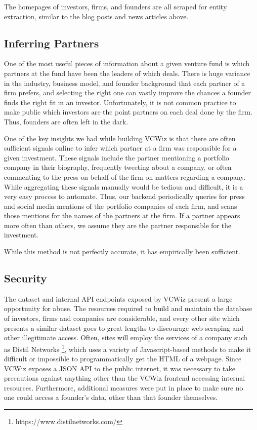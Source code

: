 The homepages of investors, firms, and founders are all scraped for entity extraction, similar to the blog posts and news articles above.

\subsection{Inferring Partners}
\label{ch4:partners}

One of the most useful pieces of information about a given venture fund is which partners at the fund have been the leaders of which deals. There is huge variance in the industry, business model, and founder background that each partner of a firm prefers, and selecting the right one can vastly improve the chances a founder finds the right fit in an investor. Unfortunately, it is not common practice to make public which investors are the point partners on each deal done by the firm. Thus, founders are often left in the dark.

One of the key insights we had while building VCWiz is that there are often sufficient signals online to infer which partner at a firm was responsible for a given investment. These signals include the partner mentioning a portfolio company in their biography, frequently tweeting about a company, or often commenting to the press on behalf of the firm on matters regarding a company. While aggregating these signals manually would be tedious and difficult, it is a very easy process to automate. Thus, our backend periodically queries for press and social media mentions of the portfolio companies of each firm, and scans those mentions for the names of the partners at the firm. If a partner appears more often than others, we assume they are the partner responsible for the investment.

While this method is not perfectly accurate, it has empirically been sufficient.

\subsection{Security}

The dataset and internal API endpoints exposed by VCWiz present a large opportunity for abuse. The resources required to build and maintain the database of investors, firms and companies are considerable, and every other site which presents a similar dataset goes to great lengths to discourage web scraping and other illegitimate access. Often, sites will employ the services of a company such as Distil Networks \footnote{https://www.distilnetworks.com/}, which uses a variety of Javascript-based methods to make it difficult or impossible to programmatically get the HTML of a webpage. Since VCWiz exposes a JSON API to the public internet, it was necessary to take precautions against anything other than the VCWiz frontend accessing internal resources. Furthermore, additional measures were put in place to make sure no one could access a founder's data, other than that founder themselves.

